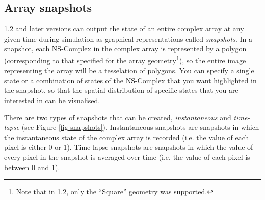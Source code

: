 \subsection{Array snapshots}
\stochsim{} 1.2 and later versions can output the state of an entire
complex array at any given time during simulation as graphical
representations called \emph{snapshots}.  In a snapshot, each
NS-Complex in the complex array is represented by a polygon
(corresponding to that specified for the array geometry\footnote{Note
  that in \stochsim{} 1.2, only the ``Square'' geometry was
  supported.}), so the entire image representing the array will be a
tesselation of polygons.  You can specify a single state
or a combination of states of the NS-Complex that you want highlighted
in the snapshot, so that the spatial distribution of specific states
that you are interested in can be visualised.

There are two types of snapshots that can be created,
\emph{instantaneous} and \emph{time-lapse} (see Figure
\ref{fig-snapshots}).  Instantaneous snapshots are snapshots in which
the instantaneous state of the complex array is recorded (i.e. the
value of each pixel is either 0 or 1).  Time-lapse snapshots are
snapshots in which the value of every pixel in the snapshot is
averaged over time (i.e. the value of each pixel is between 0 and 1).

